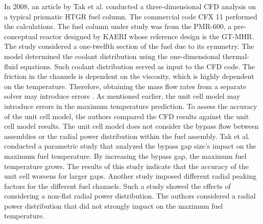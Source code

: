 In 2008, an article by Tak et al. \cite{tak_numerical_2008} conducted  a three-dimensional \gls{CFD} analysis on a typical prismatic \gls{HTGR} fuel column.
The commercial code CFX 11 \cite{ansys_incorporated_cfx_2006} performed the calculations.
The fuel column under study was from the PMR-600, a pre-conceptual reactor designed by \gls{KAERI} whose reference design is the GT-MHR.
The study considered a one-twelfth section of the fuel due to its symmetry.
The model determined the coolant distribution using the one-dimensional thermal-fluid equations.
Such coolant distribution served as input to the CFD code.
The friction in the channels is dependent on the viscosity, which is highly dependent on the temperature.
Therefore, obtaining the mass flow rates from a separate solver may introduce errors \cite{sato_computational_2010}.
As mentioned earlier, the unit cell model may introduce errors in the maximum temperature prediction.
To assess the accuracy of the unit cell model, the authors compared the CFD results against the unit cell model results.
The unit cell model does not consider the bypass flow between assemblies or the radial power distribution within the fuel assembly.
Tak et al. conducted a parametric study that analyzed the bypass gap size's impact on the maximum fuel temperature.
By increasing the bypass gap, the maximum fuel temperature grows.
The results of this study indicate that the accuracy of the unit cell worsens for larger gaps.
Another study imposed different radial peaking factors for the different fuel channels.
Such a study showed the effects of considering a non-flat radial power distribution.
The authors considered a radial power distribution that did not strongly impact on the maximum fuel temperature.


